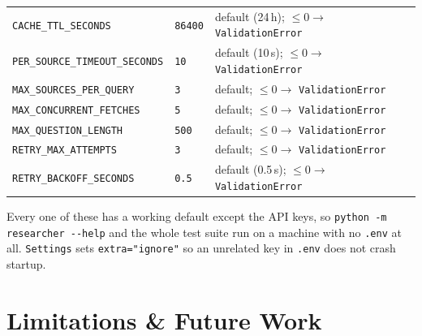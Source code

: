 \documentclass[11pt,a4paper]{article}
\begin{document}
\begin{center}
\begin{tabularx}{\textwidth}{@{}>{\RaggedRight\arraybackslash}p{5.1cm}
                              >{\RaggedRight\arraybackslash}p{2.3cm} X@{}}
\texttt{CACHE\_TTL\_SECONDS} & \texttt{86400} & default (24\,h); $\le 0 \to$ \texttt{ValidationError} \\
\texttt{PER\_SOURCE\_TIMEOUT\_SECONDS} & \texttt{10} & default (10\,s); $\le 0 \to$ \texttt{ValidationError} \\
\texttt{MAX\_SOURCES\_PER\_QUERY} & \texttt{3} & default; $\le 0 \to$ \texttt{ValidationError} \\
\texttt{MAX\_CONCURRENT\_FETCHES} & \texttt{5} & default; $\le 0 \to$ \texttt{ValidationError} \\
\texttt{MAX\_QUESTION\_LENGTH} & \texttt{500} & default; $\le 0 \to$ \texttt{ValidationError} \\
\texttt{RETRY\_MAX\_ATTEMPTS} & \texttt{3} & default; $\le 0 \to$ \texttt{ValidationError} \\
\texttt{RETRY\_BACKOFF\_SECONDS} & \texttt{0.5} & default (0.5\,s); $\le 0 \to$ \texttt{ValidationError} \\
\bottomrule
\end{tabularx}
\end{center}

\vspace{0.4em}
Every one of these has a working default except the API keys, so \texttt{python -m researcher
-{}-help} and the whole test suite run on a machine with no \texttt{.env} at all. \texttt{Settings}
sets \texttt{extra="ignore"} so an unrelated key in \texttt{.env} does not crash startup.

\section{Limitations \& Future Work}\label{sec:limits}
\end{document}
